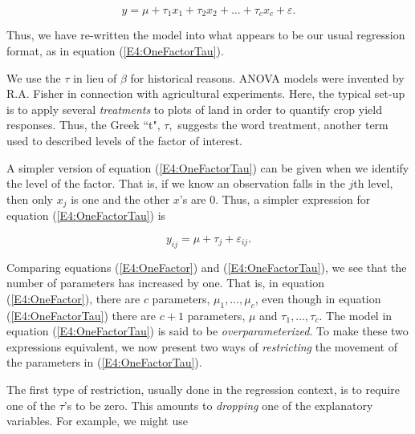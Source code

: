 \begin{equation}\label{E4:OneFactorTau}
y=\mu +\tau_1x_1+\tau_2x_2+\ldots +\tau_{c}x_{c}+\varepsilon.
\end{equation}

\noindent Thus, we have re-written the model into what appears to be
our usual regression format, as in equation (\ref{E4:OneFactorTau}).

We use the $\tau $ in lieu of $\beta $ for historical reasons. ANOVA
models were invented by R.A. Fisher in connection with agricultural
experiments. Here, the typical set-up is to apply several
\textit{treatments} to plots of land in order to quantify crop yield
responses. Thus, the Greek ``t", $\tau ,$ suggests the word
treatment, another term used to described levels of the factor of
interest.

A simpler version of equation (\ref{E4:OneFactorTau}) can be given
when we identify the level of the factor. That is, if we know an
observation falls in the $j$th level, then only $x_{j}$ is one and
the other $x$'s are 0. Thus, a simpler expression for equation
(\ref{E4:OneFactorTau}) is

\begin{equation*}
y_{ij}=\mu +\tau_{j} + \varepsilon_{ij}.
\end{equation*}

Comparing equations (\ref{E4:OneFactor}) and
(\ref{E4:OneFactorTau}), we see that the number of parameters
has increased by one. That is, in equation (\ref{E4:OneFactor}), there are $c$ parameters, $%
\mu_1,\ldots ,\mu_c$, even though in equation
(\ref{E4:OneFactorTau}) there are $c+1$ parameters, $\mu $ and $\tau
_1,\ldots ,\tau_c$. The model in equation (\ref{E4:OneFactorTau}) is
said to be \textit{overparameterized}. To make these two expressions
equivalent, we now present two ways of \textit{restricting} the
movement of the parameters in (\ref{E4:OneFactorTau}).

The first type of restriction, usually done in the regression context, is to
require one of the $\tau $'s to be zero. This amounts to \textit{dropping}
one of the explanatory variables. For example, we might use

